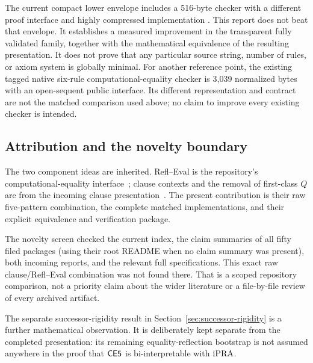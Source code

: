 The current compact lower envelope includes a 516-byte checker with a
different proof interface and highly compressed implementation
\cite{canonical}. This report does not beat that envelope. It establishes
a measured improvement in the transparent fully validated family, together
with the mathematical equivalence of the resulting presentation. It does
not prove that any particular source string, number of rules, or axiom
system is globally minimal.
For another reference point, the existing tagged native six-rule
computational-equality checker is 3,039 normalized bytes with an
open-sequent public interface. Its different representation and contract
are not the matched comparison used above; no claim to improve every
existing checker is intended.

\subsection{Attribution and the novelty boundary}

The two component ideas are inherited. Refl--Eval is the repository's
computational-equality interface~\cite{computational}; clause contexts and
the removal of first-class $Q$ are from the incoming clause
presentation~\cite{clausal}. The present contribution is their raw
five-pattern combination, the complete matched implementations, and their
explicit equivalence and verification package.

The novelty screen checked the current index, the claim summaries of all
fifty filed packages (using their root README when no claim summary was
present), both incoming reports, and the relevant full specifications.
This exact raw clause/Refl--Eval combination was not found there. That is
a scoped repository comparison, not a priority claim about the wider
literature or a file-by-file review of every archived artifact.

The separate successor-rigidity result in
Section~\ref{sec:successor-rigidity} is a further mathematical observation.
It is deliberately kept separate from the completed presentation: its
remaining equality-reflection bootstrap is not assumed anywhere in the
proof that $\mathsf{CE5}$ is bi-interpretable with $\mathrm{iPRA}$.
